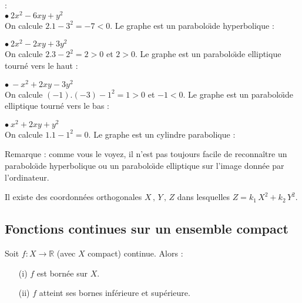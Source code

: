 \documentclass[class=report,crop=false]{standalone}
\begin{document}
 : \\
$\bullet \  2x^2 -6xy+ y^2$\\
On calcule $2.1-3^2=-7<0$. Le graphe est un parabolo\"\i de hyperbolique :
\begin{center}
\end{center}
$\bullet\   2x^2 -2xy+3 y^2$\\
On calcule $2.3-2^2=2>0$ et $2>0$. Le graphe est un parabolo\"\i de elliptique tourné vers le haut :
\begin{center}
\end{center}
$\bullet \  -x^2 +2xy-3 y^2$\\
On calcule $(-1).(-3)-1^2=1>0$ et $-1<0$. Le graphe est un parabolo\"\i de elliptique tourné vers le bas :
\begin{center}
\end{center}
$\bullet \  x^2 +2xy+ y^2$\\
On calcule $1.1-1^2=0$. Le graphe est un cylindre parabolique :
\begin{center}
\end{center}

Remarque : comme vous le voyez, il n'est pas toujours facile de reconna\^ itre un parabolo\"\i de hyperbolique ou un parabolo\"\i de elliptique sur l'image donnée par l'ordinateur.

\begin{proposition}Il existe des coordonnées orthogonales $X\,,\,Y\,,\,Z$ dans lesquelles $Z = k_{1}\, X^2 + k_{2}\, Y^2$.
\end{proposition}





\subsection{Fonctions continues sur un ensemble compact}


\begin{theoreme}
Soit $f : X \rightarrow \mathbb{R}$ (avec $X$ compact) continue. Alors :
\begin{enumerate}
\item[(i)] $f$ est bornée sur $X$.
\item[(ii)] $f$ atteint ses bornes inférieure et supérieure.
\end{enumerate}
\end{theoreme}
\end{document}

